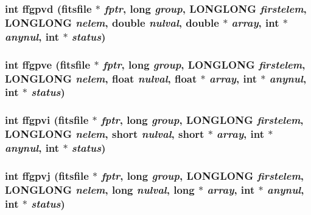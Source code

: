 \subsubsection{\setlength{\rightskip}{0pt plus 5cm}int ffgpvd (\bf{fitsfile} $\ast$ {\em fptr}, long {\em group}, \bf{LONGLONG} {\em firstelem}, \bf{LONGLONG} {\em nelem}, double {\em nulval}, double $\ast$ {\em array}, int $\ast$ {\em anynul}, int $\ast$ {\em status})}\label{test_2roimasker_2fitsio_8h_360c62c59f25501d54be60fcc9d188a3}


\subsubsection{\setlength{\rightskip}{0pt plus 5cm}int ffgpve (\bf{fitsfile} $\ast$ {\em fptr}, long {\em group}, \bf{LONGLONG} {\em firstelem}, \bf{LONGLONG} {\em nelem}, float {\em nulval}, float $\ast$ {\em array}, int $\ast$ {\em anynul}, int $\ast$ {\em status})}\label{test_2roimasker_2fitsio_8h_aec726a6192a5cb163c2be7496ba41ff}


\subsubsection{\setlength{\rightskip}{0pt plus 5cm}int ffgpvi (\bf{fitsfile} $\ast$ {\em fptr}, long {\em group}, \bf{LONGLONG} {\em firstelem}, \bf{LONGLONG} {\em nelem}, short {\em nulval}, short $\ast$ {\em array}, int $\ast$ {\em anynul}, int $\ast$ {\em status})}\label{test_2roimasker_2fitsio_8h_5cf08cc899b11b18350ec1def017de1d}


\subsubsection{\setlength{\rightskip}{0pt plus 5cm}int ffgpvj (\bf{fitsfile} $\ast$ {\em fptr}, long {\em group}, \bf{LONGLONG} {\em firstelem}, \bf{LONGLONG} {\em nelem}, long {\em nulval}, long $\ast$ {\em array}, int $\ast$ {\em anynul}, int $\ast$ {\em status})}\label{test_2roimasker_2fitsio_8h_5b4c250bd7e498f28600d4850216cb56}


